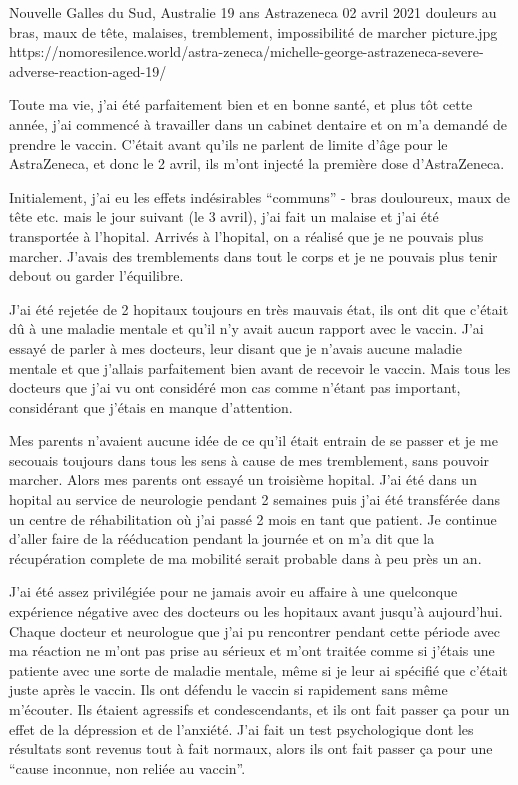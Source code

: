           {Nouvelle Galles du Sud, Australie}
          {19 ans}
          {Astrazeneca}
          {02 avril 2021}
          {douleurs au bras, maux de tête, malaises, tremblement, impossibilité de marcher}
          {picture.jpg}
          {https://nomoresilence.world/astra-zeneca/michelle-george-astrazeneca-severe-adverse-reaction-aged-19/}
          {
          
Toute ma vie, j'ai été parfaitement bien et en bonne santé, et plus tôt cette
année, j'ai commencé à travailler dans un cabinet dentaire et on m'a demandé de
prendre le vaccin. C'était avant qu'ils ne parlent de limite d'âge pour le
AstraZeneca, et donc le 2 avril, ils m'ont injecté la première dose
d'AstraZeneca.

Initialement, j'ai eu les effets indésirables “communs” - bras douloureux, maux
de tête etc. mais le jour suivant (le 3 avril), j'ai fait un malaise et j'ai été
transportée à l'hopital. Arrivés à l'hopital, on a réalisé que je ne pouvais
plus marcher. J'avais des tremblements dans tout le corps et je ne pouvais plus
tenir debout ou garder l'équilibre.

J'ai été rejetée de 2 hopitaux toujours en très mauvais état, ils ont dit que
c'était dû à une maladie mentale et qu'il n'y avait aucun rapport avec le
vaccin. J'ai essayé de parler à mes docteurs, leur disant que je n'avais aucune
maladie mentale et que j'allais parfaitement bien avant de recevoir le
vaccin. Mais tous les docteurs que j'ai vu ont considéré mon cas comme n'étant
pas important, considérant que j'étais en manque d'attention.
                
Mes parents n'avaient aucune idée de ce qu'il était entrain de se passer et je
me secouais toujours dans tous les sens à cause de mes tremblement, sans pouvoir
marcher. Alors mes parents ont essayé un troisième hopital. J'ai été dans un
hopital au service de neurologie pendant 2 semaines puis j'ai été transférée
dans un centre de réhabilitation où j'ai passé 2 mois en tant que patient. Je
continue d'aller faire de la rééducation pendant la journée et on m'a dit que la
récupération complete de ma mobilité serait probable dans à peu près un an.

J'ai été assez privilégiée pour ne jamais avoir eu affaire à une quelconque
expérience négative avec des docteurs ou les hopitaux avant jusqu'à
aujourd'hui. Chaque docteur et neurologue que j'ai pu rencontrer pendant cette
période avec ma réaction ne m'ont pas prise au sérieux et m'ont traitée comme si
j'étais une patiente avec une sorte de maladie mentale, même si je leur ai
spécifié que c'était juste après le vaccin. Ils ont défendu le vaccin si
rapidement sans même m'écouter. Ils étaient agressifs et condescendants, et ils
ont fait passer ça pour un effet de la dépression et de l'anxiété. J'ai fait un
test psychologique dont les résultats sont revenus tout à fait normaux, alors
ils ont fait passer ça pour une “cause inconnue, non reliée au vaccin”.

}
